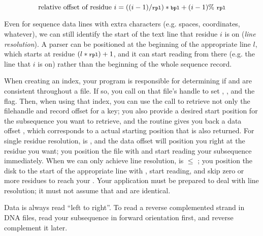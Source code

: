 \[
\mbox{relative offset of residue $i$} =
\left((i-1)/\mbox{\ccode{rpl}}\right)*\mbox{\ccode{bpl}} + (i-1) \% \mbox{ \ccode{rpl}}
\]

Even for sequence data lines with extra characters (e.g. spaces,
coordinates, whatever), we can still identify the start of the text
line that residue $i$ is on (\emph{line resolution}).  A parser can be
positioned at the beginning of the appropriate line $l$, which starts
at residue $(l*\mbox{\ccode{rpl}}) + 1$, and it can start reading from
there (e.g. the line that $i$ is on) rather than the beginning of the
whole sequence record.

When creating an index, your program is responsible for determining if
 and  are consistent throughout a file. If so,
you call  on that file's handle to set
, , and the 
flag. Then, when using that index, you can use the
 call to retrieve not only the filehandle
 and record offset  for a key; you also provide
a desired start position  for the subsequence
you want to retrieve, and the routine gives you back a data offset
, which corresponds to a actual starting position
 that is also returned. For single residue
resolution,  is , and the
data offset  will position you right at the residue you
want; you position the file with  and start reading
your subsequence immediately. When we can only achieve line
resolution,  is $\leq$ ;
you position the disk to the start of the appropriate line with
, start reading, and skip zero or more residues to
reach your . Your application must be prepared
to deal with line resolution; it must not assume that
 and  are identical.

Data is always read ``left to right''.  To read a reverse complemented
strand in DNA files, read your subsequence in forward orientation
first, and reverse complement it later.



